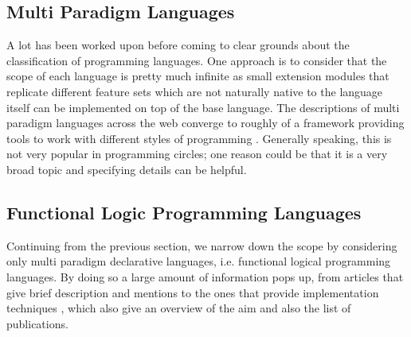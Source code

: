 \documentclass[thesis-solanki.tex]{subfiles}
\begin{document}
\subsection{Multi Paradigm Languages}

A lot has been worked upon before coming to clear grounds about the classification of programming languages.
One approach is to consider that the scope of each language is pretty much infinite as small extension modules that
replicate different feature sets which are not naturally native to the language itself can be implemented on top of
the base language.
The descriptions of multi paradigm languages across the web
\cite{website:wikimultiparadigm,website:mdn,website:blogc2} converge to roughly of a framework providing tools to work with different 
styles of programming \cite{website:wikimpllist,website:dmoz}.
Generally speaking, this
is not very popular in programming circles; one reason could be that it
is a very broad topic and specifying details can be helpful.

\subsection{Functional Logic Programming Languages}

Continuing from the previous section, we narrow down the scope by considering only multi paradigm declarative
languages, i.e. functional logical programming languages.
By doing so a large amount of information pops up, from articles that give brief description and mentions
\cite{website:wikiflpl, website:wikiflpllist} to the ones that provide implementation techniques
\cite{website:imlpementingflpl}, which also give an overview of the aim and also the list of publications.
\end{document}
